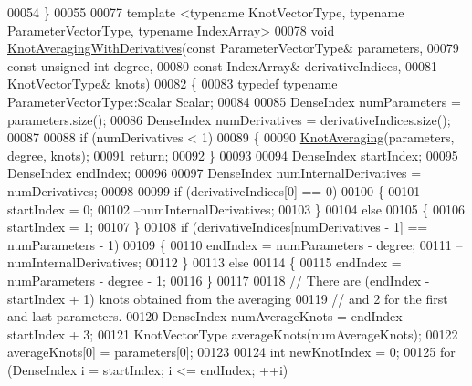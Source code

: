 \begin{DoxyCode}
00054   \}
00055 
00077   \textcolor{keyword}{template} <\textcolor{keyword}{typename} KnotVectorType, \textcolor{keyword}{typename} ParameterVectorType, \textcolor{keyword}{typename} IndexArray>
\hyperlink{group___splines___module_gae10a6f9b6ab7fb400a2526b6382c533b}{00078}   \textcolor{keywordtype}{void} \hyperlink{group___splines___module_gae10a6f9b6ab7fb400a2526b6382c533b}{KnotAveragingWithDerivatives}(\textcolor{keyword}{const} ParameterVectorType& parameters,
00079                                     \textcolor{keyword}{const} \textcolor{keywordtype}{unsigned} \textcolor{keywordtype}{int} degree,
00080                                     \textcolor{keyword}{const} IndexArray& derivativeIndices,
00081                                     KnotVectorType& knots)
00082   \{
00083     \textcolor{keyword}{typedef} \textcolor{keyword}{typename} ParameterVectorType::Scalar Scalar;
00084 
00085     DenseIndex numParameters = parameters.size();
00086     DenseIndex numDerivatives = derivativeIndices.size();
00087 
00088     \textcolor{keywordflow}{if} (numDerivatives < 1)
00089     \{
00090       \hyperlink{group___splines___module_ga9474da5ed68bbd9a6788a999330416d6}{KnotAveraging}(parameters, degree, knots);
00091       \textcolor{keywordflow}{return};
00092     \}
00093 
00094     DenseIndex startIndex;
00095     DenseIndex endIndex;
00096   
00097     DenseIndex numInternalDerivatives = numDerivatives;
00098     
00099     \textcolor{keywordflow}{if} (derivativeIndices[0] == 0)
00100     \{
00101       startIndex = 0;
00102       --numInternalDerivatives;
00103     \}
00104     \textcolor{keywordflow}{else}
00105     \{
00106       startIndex = 1;
00107     \}
00108     \textcolor{keywordflow}{if} (derivativeIndices[numDerivatives - 1] == numParameters - 1)
00109     \{
00110       endIndex = numParameters - degree;
00111       --numInternalDerivatives;
00112     \}
00113     \textcolor{keywordflow}{else}
00114     \{
00115       endIndex = numParameters - degree - 1;
00116     \}
00117 
00118     \textcolor{comment}{// There are (endIndex - startIndex + 1) knots obtained from the averaging}
00119     \textcolor{comment}{// and 2 for the first and last parameters.}
00120     DenseIndex numAverageKnots = endIndex - startIndex + 3;
00121     KnotVectorType averageKnots(numAverageKnots);
00122     averageKnots[0] = parameters[0];
00123 
00124     \textcolor{keywordtype}{int} newKnotIndex = 0;
00125     \textcolor{keywordflow}{for} (DenseIndex i = startIndex; i <= endIndex; ++i)

\end{DoxyCode}
